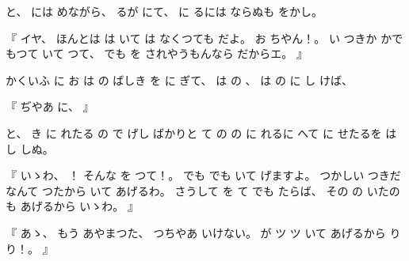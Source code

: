 %
と、
%
には
めながら、
%
るが
にて、
%
に
るには
ならぬも
をかし。

%
『
イヤ、
%
ほんとは
は
いて
は
なくつても
だよ。
%
お
ちやん！。
%
い
つきか
かで
もつて
いて
つて、
%
でも
を
されやうもんなら
だからエ。
』

%
かくいふ
に
お
は
の
ばしき
を
に
ぎて、
%
は%
の
、
%
は%
の%
に
し
けば、

%
『
ぢやあ
に、
』

%
と、
%
き
に
れたる
の
で
げし
ばかりと
て
の
の%
に
れるに
へて
に
せたるを
は
し
しぬ。

%
『
いゝわ、%
%
！\inhibitglue{}%
そんな
を
つて！。
%
でも
でも
いて
げますよ。
%
つかしい
つきだなんて
つたから
いて
あげるわ。
%
さうして
を
て
でも
たらば、
%
その
の
いたのも
あげるから
いゝわ。%
』

%
『
あゝ、%
%
もう
あやまつた、
%
つちやあ
いけない。
%
が
ツ
ツ
いて
あげるから
り
り！。
』

